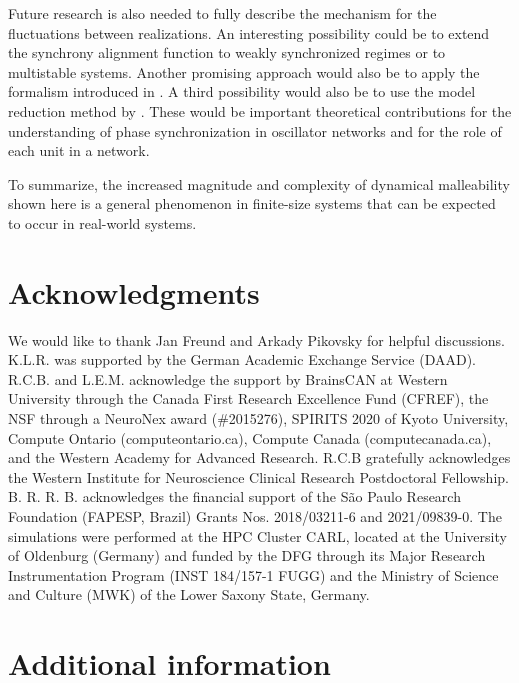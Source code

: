 Future research is also needed to fully describe the mechanism for the fluctuations between realizations. An interesting possibility could be to extend the synchrony alignment function \cite{skardal2014optimal} to weakly synchronized regimes or to multistable systems. Another promising approach would also be to apply the formalism introduced in \cite{muller2021algebraic,budzinski2022geometry}. A third possibility would also be to use the model reduction method by \cite{hancock2018model}. These would be important theoretical contributions for the understanding of phase synchronization in oscillator networks and for the role of each unit in a network.

To summarize, the increased magnitude and complexity of dynamical malleability shown here is a general phenomenon in finite-size systems that can be expected to occur in real-world systems. 


\section*{Acknowledgments}
We would like to thank Jan Freund and Arkady Pikovsky for helpful discussions. K.L.R. was supported by the German Academic Exchange Service (DAAD). R.C.B. and L.E.M. acknowledge the support by BrainsCAN at Western University through the Canada First Research Excellence Fund (CFREF), the NSF through a NeuroNex award (\#2015276), SPIRITS 2020 of Kyoto University, Compute Ontario (computeontario.ca), Compute Canada (computecanada.ca), and the Western Academy for Advanced Research. R.C.B gratefully acknowledges the Western Institute for Neuroscience Clinical Research Postdoctoral Fellowship. B. R. R. B. acknowledges the financial support of the São Paulo Research Foundation (FAPESP, Brazil) Grants Nos. 2018/03211-6 and 2021/09839-0. The simulations were performed at the HPC Cluster CARL, located at the University of Oldenburg (Germany) and funded by the DFG through its Major Research Instrumentation Program (INST 184/157-1 FUGG) and the Ministry of Science and Culture (MWK) of the Lower Saxony State, Germany.



\section*{Additional information}
